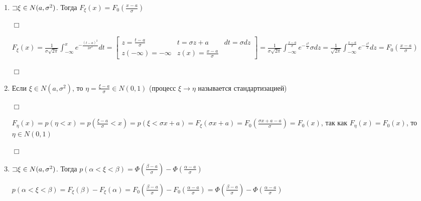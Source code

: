 \documentclass[12pt]{article}
\begin{document}
    \begin{enumerate}
        \item $\mathord{\sqsupset} \xi \in N(a, \sigma^2)$. Тогда $F_\xi(x) = F_0\left(\frac{x - a}{\sigma}\right)$

        \begin{MyProof}
            $\Box$
            
            $F_\xi(x) = \frac{1}{\sigma\sqrt{2\pi}} \int_{-\infty}^x e^{-\frac{(t - a)^2}{2\sigma^2}} dt = \left[\begin{matrix}z = \frac{t - a}{\sigma} & t = \sigma z + a & dt = \sigma dz \\ z (-\infty) = -\infty & z(x) = \frac{x - a}{\sigma} & \end{matrix}\right] = 
            \frac{1}{\sigma\sqrt{2\pi}} \int_{-\infty}^\frac{x - a}{\sigma} e^{-\frac{z^2}{2}} \sigma dz = \frac{1}{\sqrt{2\pi}} \int_{-\infty}^\frac{x - a}{\sigma} e^{-\frac{z^2}{2}} dz = F_0\left(\frac{x - a}{\sigma}\right)$
            
            $\Box$
        \end{MyProof}

        \item Если $\xi \in N(a, \sigma^2)$, то $\eta = \frac{\xi - a}{\sigma} \in N(0, 1)$ (процесс $\xi \to \eta$ называется стандартизацией)

        \begin{MyProof}
            $\Box$
            
            $F_\eta(x) = p(\eta < x) = p\left(\frac{\xi - a}{\sigma} < x\right) = p(\xi < \sigma x + a) = F_\xi(\sigma x + a) = F_0\left(\frac{\sigma x + a - a}{\sigma}\right) = F_0(x)$, так как $F_\eta(x) = F_0(x)$, то $\eta \in N(0, 1)$
            
            $\Box$
        \end{MyProof}

        \item $\mathord{\sqsupset} \xi \in N(a, \sigma^2)$. Тогда $p(\alpha < \xi < \beta) = \Phi\left(\frac{\beta - a}{\sigma}\right) - \Phi\left(\frac{\alpha - a}{\sigma}\right)$

        \begin{MyProof}
            $p(\alpha < \xi < \beta) = F_\xi(\beta) - F_\xi(\alpha) = F_0\left(\frac{\beta - a}{\sigma}\right) - F_0\left(\frac{\alpha - a}{\sigma}\right) = \Phi\left(\frac{\beta - a}{\sigma}\right) - \Phi\left(\frac{\alpha - a}{\sigma}\right)$
        \end{MyProof}


\end{enumerate}
\end{document}
